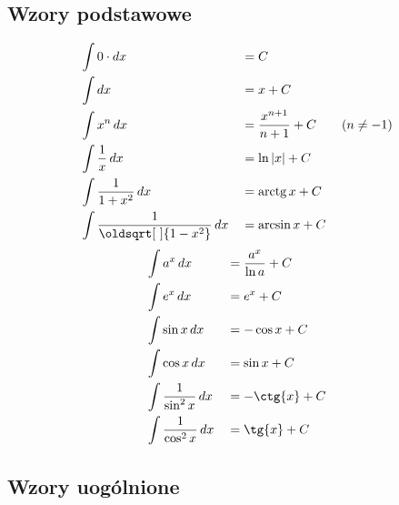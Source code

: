 \documentclass[10pt, twoside, fleqn]{article}
\renewcommand*{\sqrt}[2][\ ]{\oldsqrt[#1]{#2}}
\DeclareMathOperator{\arctg}{arctg}
\begin{document}
	\subsection{Wzory podstawowe}
		
		\begin{multicols}{2}
		\noindent
			\begin{alignat*}{2}
			&	\int{0\cdot dx}						&&=C							\\
			&	\int{dx}							&&=x+C						\\
			&	\int{x^{n}\,dx}						&&=\frac{x^{n+1}}{n+1}+C		
													 \hspace{20pt} (n \neq -1)	\\
			&	\int{\frac{1}{x}\,dx}				&&=\ln\left| x \right|+C		\\
			&	\int{\frac{1}{1+x^2}\,dx}			&&=\arctg{x}+C				\\
			&	\int{\frac{1}{\sqrt{1-x^2}}\,dx}	&&=\arcsin x+C	
			\end{alignat*}
			\begin{alignat*}{2}		
			&	\int{a^x\,dx}						&&=\frac{a^x}{\ln a}+C		\\
			&	\int{e^x \, dx}						&&=e^x + C					\\
			&	\int{\sin x\,dx}					&&=-\cos x+C					\\
			&	\int{\cos x\,dx}					&&=\sin x+C					\\
			&	\int{\frac{1}{\sin^2x}\,dx}			&&=-\ctg{x}+C				\\
			&	\int{\frac{1}{\cos^2x}\,dx}			&&=\tg{x}+C			
			\end{alignat*}	
		\end{multicols}
		\vspace{10pt}		
		
		
		
	\subsection{Wzory uogólnione}
\end{document}
